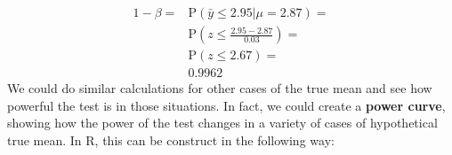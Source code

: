 \documentclass[
]{book}
\theoremstyle{definition}
\theoremstyle{definition}
\theoremstyle{definition}
\theoremstyle{definition}
\theoremstyle{remark}
\begin{document}
\begin{equation}
    \begin{aligned}
        1-\beta = & \mathrm{P}(\bar{y}\leq 2.95 | \mu=2.87) = \\
                  & \mathrm{P}\left(z \leq \frac{2.95 - 2.87}{0.03} \right) = \\
                  & \mathrm{P}\left(z \leq 2.67 \right) = \\
                  & 0.9962
    \end{aligned}
    \label{eq:powerOfATest03}
\end{equation}
We could do similar calculations for other cases of the true mean and see how powerful the test is in those situations. In fact, we could create a \textbf{power curve}, showing how the power of the test changes in a variety of cases of hypothetical true mean. In R, this can be construct in the following way:
\end{document}
